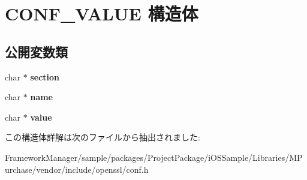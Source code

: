 \hypertarget{struct_c_o_n_f___v_a_l_u_e}{}\section{C\+O\+N\+F\+\_\+\+V\+A\+L\+U\+E 構造体}
\label{struct_c_o_n_f___v_a_l_u_e}
\subsection*{公開変数類}
\begin{DoxyCompactItemize}
\item 
\hypertarget{struct_c_o_n_f___v_a_l_u_e_a103e4a73b3523e1a3e4d4fd8f32a7fe0}{}char $\ast$ {\bfseries section}\label{struct_c_o_n_f___v_a_l_u_e_a103e4a73b3523e1a3e4d4fd8f32a7fe0}

\item 
\hypertarget{struct_c_o_n_f___v_a_l_u_e_a11c4d31c2078948fab12fd3fe2f75bbc}{}char $\ast$ {\bfseries name}\label{struct_c_o_n_f___v_a_l_u_e_a11c4d31c2078948fab12fd3fe2f75bbc}

\item 
\hypertarget{struct_c_o_n_f___v_a_l_u_e_adc4e5ad327beced987b0d51bc4bdeb6e}{}char $\ast$ {\bfseries value}\label{struct_c_o_n_f___v_a_l_u_e_adc4e5ad327beced987b0d51bc4bdeb6e}

\end{DoxyCompactItemize}


この構造体詳解は次のファイルから抽出されました\+:\begin{DoxyCompactItemize}
\item 
Framework\+Manager/sample/packages/\+Project\+Package/i\+O\+S\+Sample/\+Libraries/\+M\+Purchase/vendor/include/openssl/conf.\+h\end{DoxyCompactItemize}
